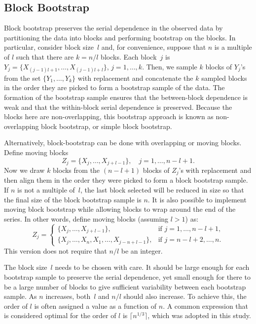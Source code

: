 \documentclass[10pt]{article}
\begin{document}
\subsection*{Block Bootstrap}

Block bootstrap preserves the serial dependence in the observed data by 
partitioning the data into blocks and performing bootstrap on the blocks. In
particular, consider block size~$l$ and, for convenience, suppose that $n$ is a 
multiple of $l$ such that there are $k = n / l$ blocks. Each block~$j$ is
$Y_j = \{X_{(j - 1) l + 1}, \ldots, X_{(j - 1) l + l}\}$, $j = 1, \ldots, k$.
Then, we sample $k$ blocks of $Y_j$'s from the set $\{Y_1, \ldots, Y_k\}$ with
replacement and concatenate the $k$ sampled blocks in the order they are picked 
to form a bootstrap sample of the data. The formation of the bootstrap sample 
ensures that the between-block dependence is weak and that the within-block 
serial dependence is preserved. Because the blocks here are non-overlapping, 
this bootstrap approach is known as non-overlapping block bootstrap, or simple 
block bootstrap.


Alternatively, block-bootstrap can be done with overlapping or moving blocks.
Define moving blocks
\[
Z_j = \{X_j, \ldots, X_{j + l - 1}\}, \quad 
j = 1, \ldots, n - l + 1.
\]
Now we draw $k$ blocks from the $(n - l + 1)$ blocks 
of $Z_j$'s with replacement and then align them in the order they were picked to 
form a block bootstrap sample. If $n$ is not a multiple of~$l$, the last block 
selected will be reduced in size so that the final size of the block bootstrap 
sample is $n$. It is also possible to implement moving block bootstrap while 
allowing blocks to wrap around the end of the series. In other words, define 
moving blocks (assuming $l > 1$) as:
\begin{equation*}
Z_j =
    \begin{cases}
        \{X_j, \ldots, X_{j + l - 1}\}, & \text{if } j = 1, \dots, n - l + 1,\\
        \{X_j, \ldots, X_n, X_1, \ldots, X_{j-n+l-1}\}, & \text{if } j = n - l
        + 2 ,\dots, n.
    \end{cases}
\end{equation*}
This version does not require that $n/l$ be an integer.


The block size~$l$ needs to be chosen with care. It should be large enough for
each bootstrap sample to preserve the serial dependence, yet small enough for
there to be a large number of blocks to give sufficient variability between each 
bootstrap sample. As $n$ increases, both~$l$ and $n / l$ should also increase. 
To achieve this, the order of $l$ is often assigned a value as a function of 
$n$. A common 
expression that is considered optimal for the order of $l$ is 
$\lceil n^{1/3} \rceil$,
\citep{buhlmann1999block} 
which was adopted in this study.
\end{document}
